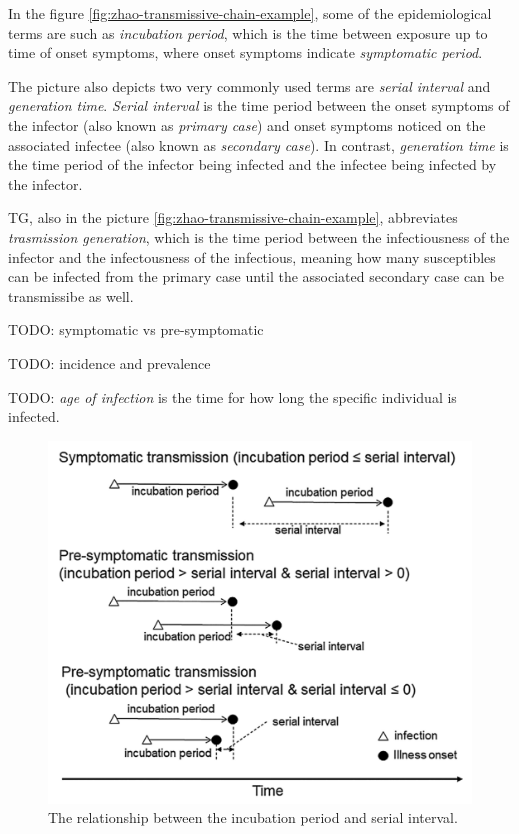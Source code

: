 \documentclass[
  digital, %
  table,   %
  twoside, %
  12pt,
  lof,     %
  lot,     %
]{fithesis3}
\begin{document}
In the figure \ref{fig:zhao-transmissive-chain-example}, some of the 
epidemiological terms are such as \textit{incubation period}, which is the time
between exposure up to time of onset symptoms, where onset symptoms
indicate \textit{symptomatic period}.

The picture also depicts two very commonly used terms
are \textit{serial interval} and \textit{generation time}.
\textit{Serial interval} is the time 
period between the onset symptoms of the infector 
(also known as \textit{primary case}) and onset symptoms noticed on the 
associated infectee (also known as \textit{secondary case}). 
In contrast, \textit{generation time} is the time period of 
the infector being infected and the infectee being 
infected by the infector.

TG, also in the picture \ref{fig:zhao-transmissive-chain-example}, abbreviates 
\textit{trasmission generation}, which is the time 
period between the infectiousness of the infector 
and the infectousness of the infectious, meaning 
how many susceptibles can be infected from the 
primary case until the associated secondary case can 
be transmissibe as well.

TODO: symptomatic vs pre-symptomatic

TODO: incidence and prevalence

TODO: \textit{age of infection} is the time for how long the specific individual is infected.

\begin{figure}[h]
  \includegraphics[width=\textwidth]{images/nishiura2020_terms.png}
  \caption{The relationship between the incubation period and serial interval. \cite{nishiura2020}}
  \label{fig:nishiura-transmission}
\end{figure}
\end{document}
